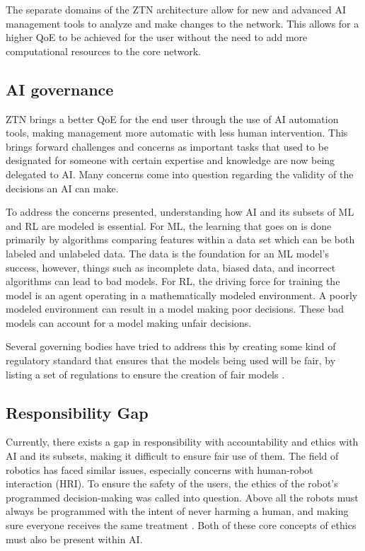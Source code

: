 The separate domains of the ZTN architecture allow for new and advanced AI management tools to analyze and make changes to the network. This allows for a higher QoE to be achieved for the user without the need to add more computational resources to the core network. 

\subsection {AI governance}

ZTN brings a better QoE for the end user through the use of AI automation tools, making management more automatic with less human intervention. This brings forward challenges and concerns as important tasks that used to be designated for someone with certain expertise and knowledge are now being delegated to AI. Many concerns come into question regarding the validity of the decisions an AI can make.

To address the concerns presented, understanding how AI and its subsets of ML and RL are modeled is essential. For ML, the learning that goes on is done primarily by algorithms comparing features within a data set which can be both labeled and unlabeled data. The data is the foundation for an ML model's success, however, things such as incomplete data, biased data, and incorrect algorithms can lead to bad models. For RL, the driving force for training the model is an agent operating in a mathematically modeled environment. A poorly modeled environment can result in a model making poor decisions. These bad models can account for a model making unfair decisions.


Several governing bodies have tried to address this by creating some kind of regulatory standard that ensures that the models being used will be fair, by listing a set of regulations to ensure the creation of fair models \cite{AIGOV-EU, AIGOV-CAD, AIGOV-USA}.



\subsection{Responsibility Gap}


Currently, there exists a gap in responsibility with accountability and ethics with AI and its subsets, making it difficult to ensure fair use of them. The field of robotics has faced similar issues, especially concerns with human-robot interaction (HRI). To ensure the safety of the users, the ethics of the robot's programmed decision-making was called into question. Above all the robots must always be programmed with the intent of never harming a human\cite{robotics-1}, and making sure everyone receives the same treatment \cite{robotics-2}. Both of these core concepts of ethics must also be present within AI.